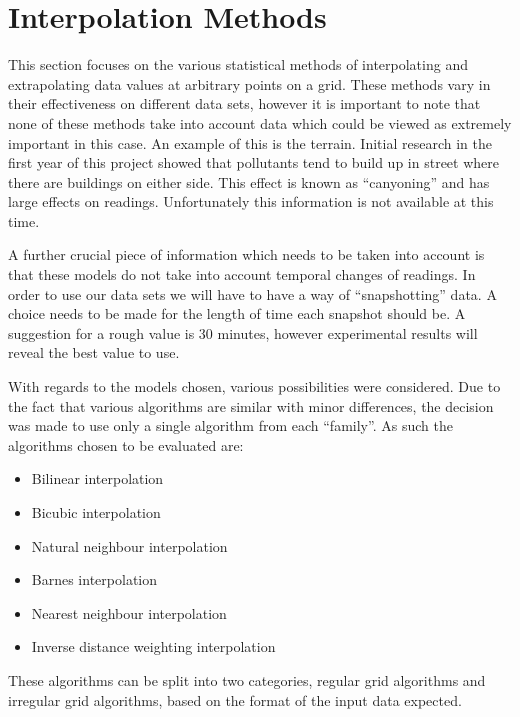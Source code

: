 \section{Interpolation Methods}\label{background_interpolation_methods}
    This section focuses on the various statistical methods of interpolating and extrapolating data values at arbitrary points on a grid. These methods vary in their effectiveness on different data sets, however it is important to note that none of these methods take into account data which could be viewed as extremely important in this case. An example of this is the terrain. Initial research in the first year of this project showed that pollutants tend to build up in street where there are buildings on either side. This effect is known as ``canyoning'' and has large effects on readings. Unfortunately this information is not available at this time. 

    A further crucial piece of information which needs to be taken into account is that these models do not take into account temporal changes of readings. In order to use our data sets we will have to have a way of ``snapshotting'' data. A choice needs to be made for the length of time each snapshot should be. A suggestion for a rough value is 30 minutes, however experimental results will reveal the best value to use. 

    With regards to the models chosen, various possibilities were considered. Due to the fact that various algorithms are similar with minor differences, the decision was made to use only a single algorithm from each ``family''. As such the algorithms chosen to be evaluated are:

    \begin{itemize}
        \item Bilinear interpolation
        \item Bicubic interpolation
        \item Natural neighbour interpolation
        \item Barnes interpolation
        \item Nearest neighbour interpolation
        \item Inverse distance weighting interpolation
    \end{itemize}

    These algorithms can be split into two categories, regular grid algorithms and irregular grid algorithms, based on the format of the input data expected. 

